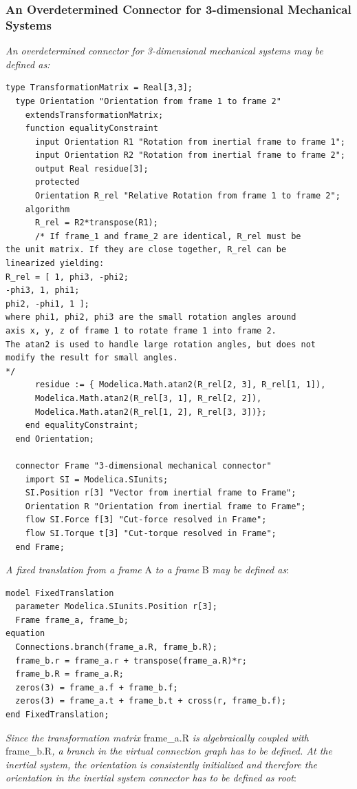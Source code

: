 \documentclass[10pt,a4paper]{report}
\def\doublelabel#1{\label{#1}\hypertarget{#1}{}}
\begin{document}
\subsubsection{An Overdetermined Connector for 3-dimensional Mechanical Systems}\doublelabel{an-overdetermined-connector-for-3-dimensional-mechanical-systems}

\emph{An overdetermined connector for 3-dimensional mechanical systems
may be defined as:}

\begin{lstlisting}[language=modelica]
  type TransformationMatrix = Real[3,3];
  type Orientation "Orientation from frame 1 to frame 2"
    extendsTransformationMatrix;
    function equalityConstraint
      input Orientation R1 "Rotation from inertial frame to frame 1";
      input Orientation R2 "Rotation from inertial frame to frame 2";
      output Real residue[3];
      protected
      Orientation R_rel "Relative Rotation from frame 1 to frame 2";
    algorithm
      R_rel = R2*transpose(R1);
      /* If frame_1 and frame_2 are identical, R_rel must be
the unit matrix. If they are close together, R_rel can be
linearized yielding:
R_rel = [ 1, phi3, -phi2;
-phi3, 1, phi1;
phi2, -phi1, 1 ];
where phi1, phi2, phi3 are the small rotation angles around
axis x, y, z of frame 1 to rotate frame 1 into frame 2.
The atan2 is used to handle large rotation angles, but does not
modify the result for small angles.
*/
      residue := { Modelica.Math.atan2(R_rel[2, 3], R_rel[1, 1]),
      Modelica.Math.atan2(R_rel[3, 1], R_rel[2, 2]),
      Modelica.Math.atan2(R_rel[1, 2], R_rel[3, 3])};
    end equalityConstraint;
  end Orientation;

  connector Frame "3-dimensional mechanical connector"
    import SI = Modelica.SIunits;
    SI.Position r[3] "Vector from inertial frame to Frame";
    Orientation R "Orientation from inertial frame to Frame";
    flow SI.Force f[3] "Cut-force resolved in Frame";
    flow SI.Torque t[3] "Cut-torque resolved in Frame";
  end Frame;
\end{lstlisting}
\emph{A fixed translation from a frame} A \emph{to a frame} B \emph{may
be defined as}:

\begin{lstlisting}[language=modelica]
model FixedTranslation
  parameter Modelica.SIunits.Position r[3];
  Frame frame_a, frame_b;
equation
  Connections.branch(frame_a.R, frame_b.R);
  frame_b.r = frame_a.r + transpose(frame_a.R)*r;
  frame_b.R = frame_a.R;
  zeros(3) = frame_a.f + frame_b.f;
  zeros(3) = frame_a.t + frame_b.t + cross(r, frame_b.f);
end FixedTranslation;
\end{lstlisting}
\emph{Since the transformation matrix} frame\_a.R \emph{is algebraically
coupled with} frame\_b.R\emph{, a branch in the virtual connection graph
has to be defined. At the inertial system, the orientation is
consistently initialized and therefore the orientation in the inertial
system connector has to be defined as root}:
\end{document}
